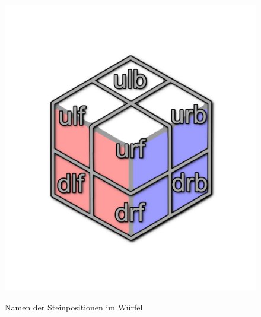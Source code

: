 \documentclass[12pt,a4paper, usenames, dvipsnames]{article}
\theoremstyle{mystyle}
\theoremstyle{definition}
\begin{document}
\begin{minipage}[b][][b]{0.04\textwidth}$\ $ 
\end{minipage}\begin{minipage}[b][][b]{0.43\textwidth}

\begin{figure}[H]
\centering
\includegraphics[scale=0.14]{caged_positions.png} \\
\caption[Namen der Steinpositionen im Würfel]{Namen der Steinpositionen im Würfel}
\label{Abbildung_SteinpositionNamen}
\end{figure}

\end{minipage}\begin{minipage}[b][][b]{0.06\textwidth}$\ $ \end{minipage}\begin{minipage}[b][][b]{0.43\textwidth}


\end{minipage}
\end{document}
